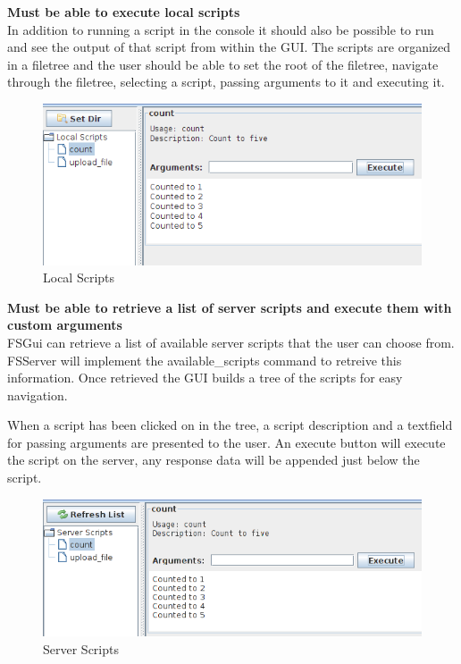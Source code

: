 \textbf{Must be able to execute local scripts} \\
In addition to running a script in the console it should also be possible to run and see the output of that script from within the GUI. The scripts are organized in a filetree and the user should be able to set the root of the filetree, navigate through the filetree, selecting a script, passing arguments to it and executing it.

\begin{figure}[h!] \centering
	\includegraphics[scale=0.5]{img/fsgui_local}
  \caption{Local Scripts}
\end{figure}

\textbf{Must be able to retrieve a list of server scripts and execute them with custom arguments} \\
FSGui can retrieve a list of available server scripts that the user can choose from. FSServer will implement the available\_scripts command to retreive this information. Once retrieved the GUI builds a tree of the scripts for easy navigation.

When a script has been clicked on in the tree, a script description and a textfield for passing arguments are presented to the user. An execute button will execute the script on the server, any response data will be appended just below the script.

\begin{figure}[h!] \centering
	\includegraphics[scale=0.5]{img/fsgui_server}
  \caption{Server Scripts}
\end{figure}

